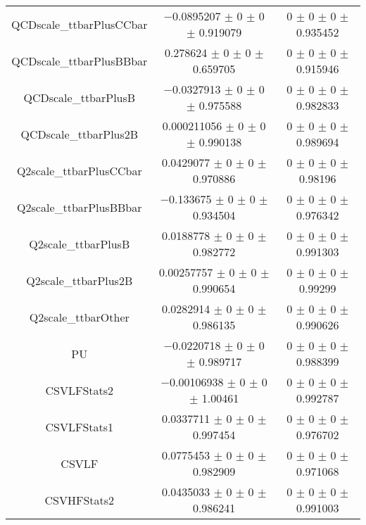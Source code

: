 \begin{table}
\begin{tabular}{ccc}
QCDscale\_ttbarPlusCCbar 	& \num{-0.0895207} $\pm$ \num{0} $\pm$ \num{0} $\pm$ \num{0.919079} 	& \num{0} $\pm$ \num{0} $\pm$ \num{0} $\pm$ \num{0.935452}\\
QCDscale\_ttbarPlusBBbar 	& \num{0.278624} $\pm$ \num{0} $\pm$ \num{0} $\pm$ \num{0.659705} 	& \num{0} $\pm$ \num{0} $\pm$ \num{0} $\pm$ \num{0.915946}\\
QCDscale\_ttbarPlusB 	& \num{-0.0327913} $\pm$ \num{0} $\pm$ \num{0} $\pm$ \num{0.975588} 	& \num{0} $\pm$ \num{0} $\pm$ \num{0} $\pm$ \num{0.982833}\\
QCDscale\_ttbarPlus2B 	& \num{0.000211056} $\pm$ \num{0} $\pm$ \num{0} $\pm$ \num{0.990138} 	& \num{0} $\pm$ \num{0} $\pm$ \num{0} $\pm$ \num{0.989694}\\
Q2scale\_ttbarPlusCCbar 	& \num{0.0429077} $\pm$ \num{0} $\pm$ \num{0} $\pm$ \num{0.970886} 	& \num{0} $\pm$ \num{0} $\pm$ \num{0} $\pm$ \num{0.98196}\\
Q2scale\_ttbarPlusBBbar 	& \num{-0.133675} $\pm$ \num{0} $\pm$ \num{0} $\pm$ \num{0.934504} 	& \num{0} $\pm$ \num{0} $\pm$ \num{0} $\pm$ \num{0.976342}\\
Q2scale\_ttbarPlusB 	& \num{0.0188778} $\pm$ \num{0} $\pm$ \num{0} $\pm$ \num{0.982772} 	& \num{0} $\pm$ \num{0} $\pm$ \num{0} $\pm$ \num{0.991303}\\
Q2scale\_ttbarPlus2B 	& \num{0.00257757} $\pm$ \num{0} $\pm$ \num{0} $\pm$ \num{0.990654} 	& \num{0} $\pm$ \num{0} $\pm$ \num{0} $\pm$ \num{0.99299}\\
Q2scale\_ttbarOther 	& \num{0.0282914} $\pm$ \num{0} $\pm$ \num{0} $\pm$ \num{0.986135} 	& \num{0} $\pm$ \num{0} $\pm$ \num{0} $\pm$ \num{0.990626}\\
PU 	& \num{-0.0220718} $\pm$ \num{0} $\pm$ \num{0} $\pm$ \num{0.989717} 	& \num{0} $\pm$ \num{0} $\pm$ \num{0} $\pm$ \num{0.988399}\\
CSVLFStats2 	& \num{-0.00106938} $\pm$ \num{0} $\pm$ \num{0} $\pm$ \num{1.00461} 	& \num{0} $\pm$ \num{0} $\pm$ \num{0} $\pm$ \num{0.992787}\\
CSVLFStats1 	& \num{0.0337711} $\pm$ \num{0} $\pm$ \num{0} $\pm$ \num{0.997454} 	& \num{0} $\pm$ \num{0} $\pm$ \num{0} $\pm$ \num{0.976702}\\
CSVLF 	& \num{0.0775453} $\pm$ \num{0} $\pm$ \num{0} $\pm$ \num{0.982909} 	& \num{0} $\pm$ \num{0} $\pm$ \num{0} $\pm$ \num{0.971068}\\
CSVHFStats2 	& \num{0.0435033} $\pm$ \num{0} $\pm$ \num{0} $\pm$ \num{0.986241} 	& \num{0} $\pm$ \num{0} $\pm$ \num{0} $\pm$ \num{0.991003}\\

\end{tabular}
\end{table}
